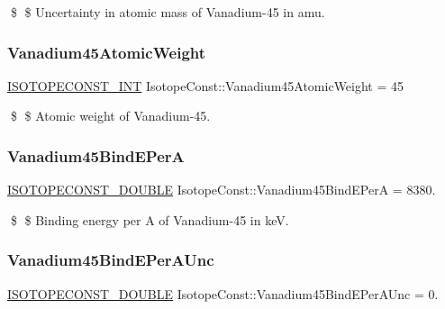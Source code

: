 \$ \$ Uncertainty in atomic mass of Vanadium-\/45 in amu. \mbox{\label{group___isotope_const-_vanadium-_v45_gab8a88734c45ade7a54c0fe9fdd32927e}} 
\subsubsection{\texorpdfstring{Vanadium45\+Atomic\+Weight}{Vanadium45AtomicWeight}}
{\footnotesize\ttfamily \mbox{\hyperlink{group___isotope_const-_macros_ga5f18360b3e99483a35c32d789e62621c}{I\+S\+O\+T\+O\+P\+E\+C\+O\+N\+S\+T\+\_\+\+I\+NT}} Isotope\+Const\+::\+Vanadium45\+Atomic\+Weight = 45}

\$ \$ Atomic weight of Vanadium-\/45. \mbox{\label{group___isotope_const-_vanadium-_v45_gac4fbf58e721e6c0cd28d10da04dbbd9b}} 
\subsubsection{\texorpdfstring{Vanadium45\+Bind\+E\+PerA}{Vanadium45BindEPerA}}
{\footnotesize\ttfamily \mbox{\hyperlink{group___isotope_const-_macros_ga8f45a7272ce02c0b4c65c44636ed719a}{I\+S\+O\+T\+O\+P\+E\+C\+O\+N\+S\+T\+\_\+\+D\+O\+U\+B\+LE}} Isotope\+Const\+::\+Vanadium45\+Bind\+E\+PerA = 8380.}

\$ \$ Binding energy per A of Vanadium-\/45 in keV. \mbox{\label{group___isotope_const-_vanadium-_v45_gae94ae5d5df20f29f8ba7efb25bbc4dc9}} 
\subsubsection{\texorpdfstring{Vanadium45\+Bind\+E\+Per\+A\+Unc}{Vanadium45BindEPerAUnc}}
{\footnotesize\ttfamily \mbox{\hyperlink{group___isotope_const-_macros_ga8f45a7272ce02c0b4c65c44636ed719a}{I\+S\+O\+T\+O\+P\+E\+C\+O\+N\+S\+T\+\_\+\+D\+O\+U\+B\+LE}} Isotope\+Const\+::\+Vanadium45\+Bind\+E\+Per\+A\+Unc = 0.}

